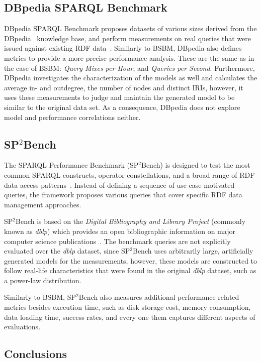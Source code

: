 \subsection{DBpedia SPARQL Benchmark}
DBpedia SPARQL Benchmark proposes datasets of various sizes derived from the DBpedia~\cite{dbpedia_data} knowledge base, and perform measurements on real queries that were issued against existing RDF data~\cite{dbpedia}. Similarly to BSBM, DBpedia also defines metrics to provide a more precise performance analysis. These are the same as in the case of BSBM: \textit{Query Mixes per Hour}, and \textit{Queries per Second}. Furthermore, DBpedia investigates the characterization of the models as well and calculates the average in- and outdegree, the number of nodes and distinct IRIs, however, it uses these measurements to judge and maintain the generated model to be similar to the original data set. As a consequence, DBpedia does not explore model and performance correlations neither.

\subsection{SP$^2$Bench}
The SPARQL Performance Benchmark (SP$^2$Bench) is designed to test the most common SPARQL constructs,
operator constellations, and a broad range of RDF data access patterns~\cite{sp2bench}. Instead of defining a sequence of use case motivated queries, the framework proposes various queries that cover specific RDF data management approaches.

SP$^2$Bench is based on the \textit{Digital Bibliography and Library Project} (commonly known as \textit{dblp}) which provides an open bibliographic information on major computer science publications~\cite{dblp}. The benchmark queries are not explicitly evaluated over the \textit{dblp} dataset, since SP$^2$Bench uses arbitrarily large, artificially generated models for the measurements, however, these models are constructed to follow real-life characteristics that were found in the original \textit{dblp} dataset, such as a power-law distribution.

Similarly to BSBM, SP$^2$Bench also measures additional performance related metrics besides execution time, such as disk storage cost, memory consumption, data loading time, success rates, and every one them captures different aspects of evaluations.


\subsection{Conclusions} \label{sec:benchmark_conclusions}

